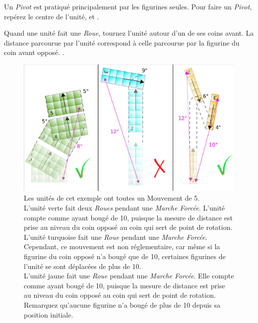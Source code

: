 Un \emph{Pivot} est pratiqué principalement par les figurines seules. Pour faire un \emph{Pivot}, repérez le centre de l'unité, et .

Quand une unité fait une \emph{Roue}, tournez l'unité autour d'un de ses coins avant. La distance parcourue par l'unité correspond à celle parcourue par la figurine du coin avant opposé. .

\begin{figure}[!htbp]
\centering
\includegraphics[width=15.5cm]{roue.png}
\caption{Les unités de cet exemple ont toutes un Mouvement de 5. \\
L'unité verte fait deux \emph{Roues} pendant une \emph{Marche Forcée}. L'unité compte comme ayant bougé de \unit{10}{\pouce}, puisque la mesure de distance est prise au niveau du coin opposé au coin qui sert de point de rotation. \\
L'unité turquoise fait une \emph{Roue} pendant une \emph{Marche Forcée}. Cependant, ce mouvement est non réglementaire, car même si la figurine du coin opposé n'a bougé que de \unit{10}{\pouce}, certaines figurines de l'unité se sont déplacées de plus de \unit{10}{\pouce}. \\
L'unité jaune fait une \emph{Roue} pendant une \emph{Marche Forcée}. Elle compte comme ayant bougé de \unit{10}{\pouce}, puisque la mesure de distance est prise au niveau du coin opposé au coin qui sert de point de rotation. Remarquez qu'aucune figurine n'a bougé de plus de \unit{10}{\pouce} depuis sa position initiale.}
\label{figure/roue}
\end{figure}
